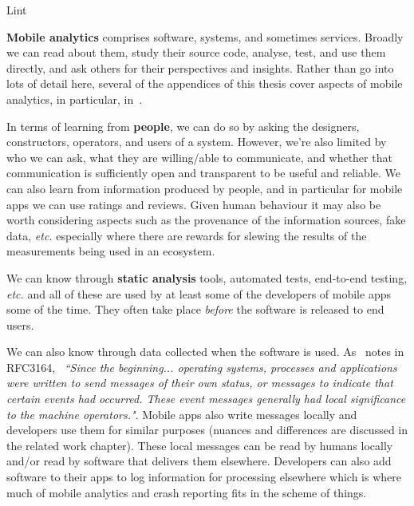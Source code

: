Lint~


\textbf{Mobile analytics} comprises software, systems, and sometimes services. Broadly we can read about them, study their source code, analyse, test, and use them directly, and ask others for their perspectives and insights. Rather than go into lots of detail here, several of the appendices of this thesis cover aspects of mobile analytics, in particular, in~\href{app:on-mobile-analytics}{\emph{}}.

In terms of learning from \textbf{people}, we can do so by asking the designers, constructors, operators, and users of a system. However, we're also limited by who we can ask, what they are willing/able to communicate, and whether that communication is sufficiently open and transparent to be useful and reliable. We can also learn from information produced by people, and in particular for mobile apps we can use ratings and reviews. Given human behaviour it may also be worth considering aspects such as the provenance of the information sources, fake data, \emph{etc.} especially where there are rewards for slewing the results of the measurements being used in an ecosystem.

We can know through \textbf{static analysis} tools, automated tests, end-to-end testing, \emph{etc.} and all of these are used by at least some of the developers of mobile apps some of the time. They often take place \textit{before} the software is released to end users.

We can also know through data collected when the software is used. As~ notes in RFC3164, ~\emph{``Since the beginning... operating systems, processes and applications were written to send messages of their own status, or messages to indicate that certain events had occurred. These event messages generally had local significance to the machine operators."}. Mobile apps also write messages locally and developers use them for similar purposes (nuances and differences are discussed in the related work chapter). These local messages can be read by humans locally and/or read by software that delivers them elsewhere. Developers can also add software to their apps to log information for processing elsewhere which is where much of mobile analytics and crash reporting fits in the scheme of things.

